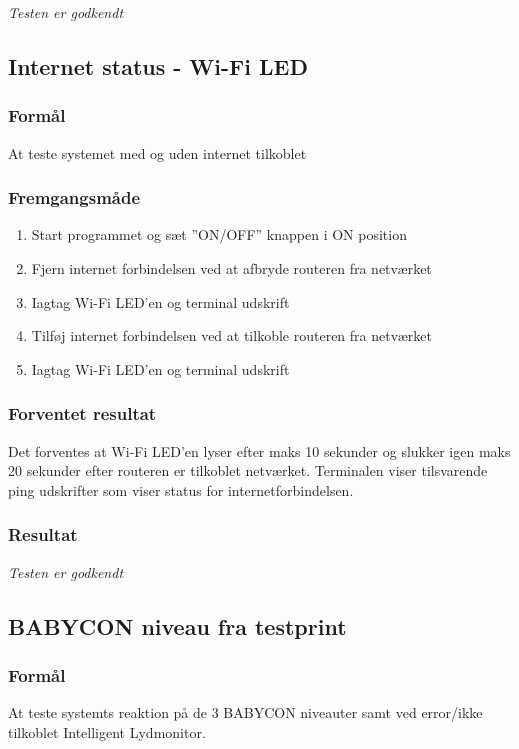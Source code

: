 \textit{Testen er godkendt}

\subsection*{Internet status - Wi-Fi LED}

\subsubsection*{Formål}
At teste systemet med og uden internet tilkoblet

\subsubsection*{Fremgangsmåde}
\begin{enumerate}
\item Start programmet og sæt ''ON/OFF'' knappen i ON position
\item Fjern internet forbindelsen ved at afbryde routeren fra netværket
\item Iagtag Wi-Fi LED'en og terminal udskrift
\item Tilføj internet forbindelsen ved at tilkoble routeren fra netværket
\item Iagtag Wi-Fi LED'en og terminal udskrift
\end{enumerate}

\subsubsection*{Forventet resultat} 
Det forventes at Wi-Fi LED'en lyser efter maks 10 sekunder og slukker igen maks 20 sekunder efter routeren er tilkoblet netværket. Terminalen viser tilsvarende ping udskrifter som viser status for internetforbindelsen.

\subsubsection*{Resultat} 


\textit{Testen er godkendt}

\subsection*{BABYCON niveau fra testprint}

\subsubsection*{Formål}
At teste systemts reaktion på de 3 BABYCON niveauter samt ved error/ikke tilkoblet Intelligent Lydmonitor.

